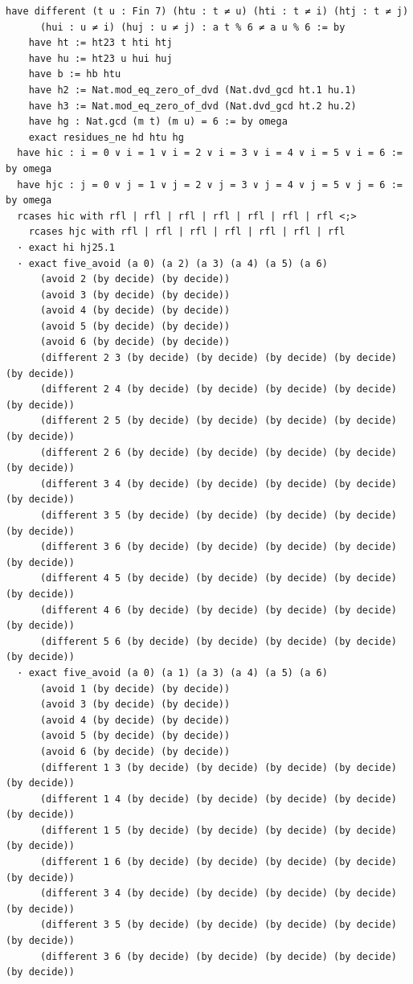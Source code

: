 \documentclass[11pt,a4paper]{article}
\begin{document}
\begin{Verbatim}[breaklines,breakanywhere,fontsize=\footnotesize]
  have different (t u : Fin 7) (htu : t ≠ u) (hti : t ≠ i) (htj : t ≠ j)
      (hui : u ≠ i) (huj : u ≠ j) : a t % 6 ≠ a u % 6 := by
    have ht := ht23 t hti htj
    have hu := ht23 u hui huj
    have b := hb htu
    have h2 := Nat.mod_eq_zero_of_dvd (Nat.dvd_gcd ht.1 hu.1)
    have h3 := Nat.mod_eq_zero_of_dvd (Nat.dvd_gcd ht.2 hu.2)
    have hg : Nat.gcd (m t) (m u) = 6 := by omega
    exact residues_ne hd htu hg
  have hic : i = 0 ∨ i = 1 ∨ i = 2 ∨ i = 3 ∨ i = 4 ∨ i = 5 ∨ i = 6 := by omega
  have hjc : j = 0 ∨ j = 1 ∨ j = 2 ∨ j = 3 ∨ j = 4 ∨ j = 5 ∨ j = 6 := by omega
  rcases hic with rfl | rfl | rfl | rfl | rfl | rfl | rfl <;>
    rcases hjc with rfl | rfl | rfl | rfl | rfl | rfl | rfl
  · exact hi hj25.1
  · exact five_avoid (a 0) (a 2) (a 3) (a 4) (a 5) (a 6)
      (avoid 2 (by decide) (by decide))
      (avoid 3 (by decide) (by decide))
      (avoid 4 (by decide) (by decide))
      (avoid 5 (by decide) (by decide))
      (avoid 6 (by decide) (by decide))
      (different 2 3 (by decide) (by decide) (by decide) (by decide) (by decide))
      (different 2 4 (by decide) (by decide) (by decide) (by decide) (by decide))
      (different 2 5 (by decide) (by decide) (by decide) (by decide) (by decide))
      (different 2 6 (by decide) (by decide) (by decide) (by decide) (by decide))
      (different 3 4 (by decide) (by decide) (by decide) (by decide) (by decide))
      (different 3 5 (by decide) (by decide) (by decide) (by decide) (by decide))
      (different 3 6 (by decide) (by decide) (by decide) (by decide) (by decide))
      (different 4 5 (by decide) (by decide) (by decide) (by decide) (by decide))
      (different 4 6 (by decide) (by decide) (by decide) (by decide) (by decide))
      (different 5 6 (by decide) (by decide) (by decide) (by decide) (by decide))
  · exact five_avoid (a 0) (a 1) (a 3) (a 4) (a 5) (a 6)
      (avoid 1 (by decide) (by decide))
      (avoid 3 (by decide) (by decide))
      (avoid 4 (by decide) (by decide))
      (avoid 5 (by decide) (by decide))
      (avoid 6 (by decide) (by decide))
      (different 1 3 (by decide) (by decide) (by decide) (by decide) (by decide))
      (different 1 4 (by decide) (by decide) (by decide) (by decide) (by decide))
      (different 1 5 (by decide) (by decide) (by decide) (by decide) (by decide))
      (different 1 6 (by decide) (by decide) (by decide) (by decide) (by decide))
      (different 3 4 (by decide) (by decide) (by decide) (by decide) (by decide))
      (different 3 5 (by decide) (by decide) (by decide) (by decide) (by decide))
      (different 3 6 (by decide) (by decide) (by decide) (by decide) (by decide))

\end{Verbatim}
\end{document}
